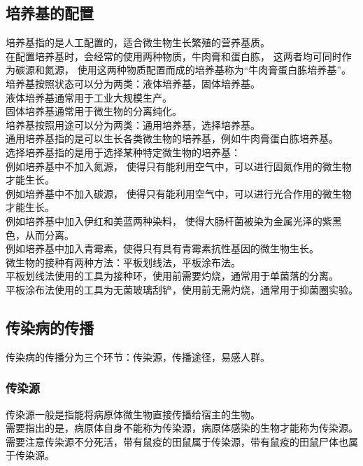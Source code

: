 \documentclass[UTF8]{ctexart}
\begin{document}
\subsection{培养基的配置}
    培养基指的是人工配置的，适合微生物生长繁殖的营养基质。\\[3mm]
    在配置培养基时，会经常的使用两种物质，牛肉膏和蛋白胨，
    这两者均可同时作为碳源和氮源，
    使用这两种物质配置而成的培养基称为“牛肉膏蛋白胨培养基”。\\[6mm]
    培养基按照状态可以分为两类：液体培养基，固体培养基。\\[3mm]
    液体培养基通常用于工业大规模生产。\\[3mm]
    固体培养基通常用于微生物的分离纯化。\\[6mm]
    培养基按照用途可以分为两类：通用培养基，选择培养基。\\[3mm]
    通用培养基指的是可以生长各类微生物的培养基，例如牛肉膏蛋白胨培养基。\\[3mm]
    选择培养基指的是用于选择某种特定微生物的培养基：\\[3mm]
    例如培养基中不加入氮源，
    使得只有能利用空气中，可以进行固氮作用的微生物才能生长。\\[3mm]
    例如培养基中不加入碳源，
    使得只有能利用空气中，可以进行光合作用的微生物才能生长。\\[3mm]
    例如培养基中加入伊红和美蓝两种染料，
    使得大肠杆菌被染为金属光泽的紫黑色，从而分离。\\[3mm]
    例如培养基中加入青霉素，使得只有具有青霉素抗性基因的微生物生长。\\[6mm]
    微生物的接种有两种方法：平板划线法，平板涂布法。\\[3mm]
    平板划线法使用的工具为接种环，使用前需要灼烧，通常用于单菌落的分离。\\[3mm]
    平板涂布法使用的工具为无菌玻璃刮铲，使用前无需灼烧，通常用于抑菌圈实验。\\

\subsection{传染病的传播}
    传染病的传播分为三个环节：传染源，传播途径，易感人群。
    
\subsubsection{传染源}
    传染源一般是指能将病原体微生物直接传播给宿主的生物。\\[3mm]
    需要指出的是，病原体自身不能称为传染源，病原体感染的生物才能称为传染源。\\[3mm]
    需要注意传染源不分死活，带有鼠疫的田鼠属于传染源，带有鼠疫的田鼠尸体也属于传染源。
\end{document}
